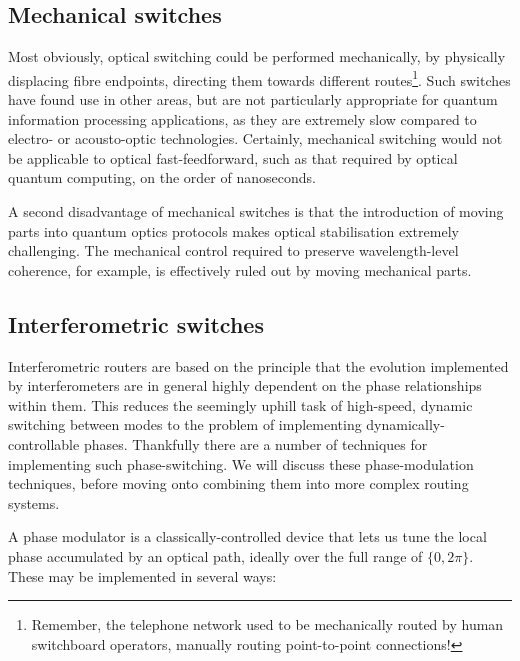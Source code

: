 %
%

\subsection{Mechanical switches}

Most obviously, optical switching could be performed mechanically, by physically displacing fibre endpoints, directing them towards different routes\footnote{Remember, the telephone network used to be mechanically routed by human switchboard operators, manually routing point-to-point connections!}. Such switches have found use in other areas, but are not particularly appropriate for quantum information processing applications, as they are extremely slow compared to electro- or acousto-optic technologies. Certainly, mechanical switching would not be applicable to optical fast-feedforward, such as that required by optical quantum computing, on the order of nanoseconds.

A second disadvantage of mechanical switches is that the introduction of moving parts into quantum optics protocols makes optical stabilisation extremely challenging. The mechanical control required to preserve wavelength-level coherence, for example, is effectively ruled out by moving mechanical parts.

%
%

\subsection{Interferometric switches} 

Interferometric routers are based on the principle that the evolution implemented by interferometers are in general highly dependent on the phase relationships within them. This reduces the seemingly uphill task of high-speed, dynamic switching between modes to the problem of implementing dynamically-controllable phases. Thankfully there are a number of techniques for implementing such phase-switching. We will discuss these phase-modulation techniques, before moving onto combining them into more complex routing systems.

A phase modulator is a classically-controlled device that lets us tune the local phase accumulated by an optical path, ideally over the full range of $\{0,2\pi\}$. These may be implemented in several ways:

%
%

